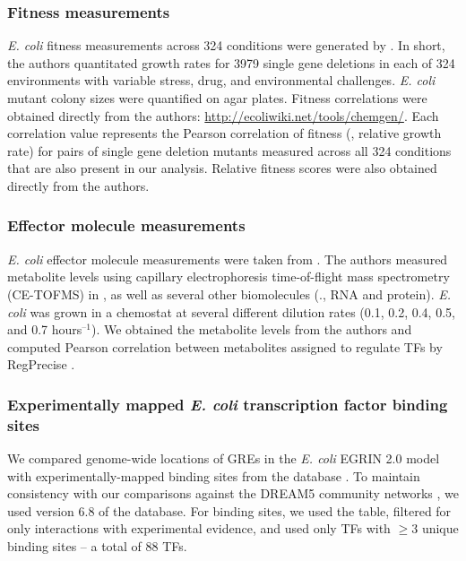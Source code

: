 \subsubsection{Fitness measurements}
\label{section:fitness}
{\it E. coli} fitness measurements across 324 conditions were
generated by \cite{Nichols2011}. In short, the authors quantitated
growth rates for 3979 single gene deletions in each of 324 environments 
with variable stress, drug, and environmental challenges. \textit{E. coli} mutant
colony sizes were quantified on agar plates.  
Fitness correlations were obtained directly from the authors: \href{http://ecoliwiki.net/tools/chemgen/}{http://ecoliwiki.net/tools/chemgen/}. Each correlation value represents
the Pearson correlation of fitness (\ie, relative growth rate) for
pairs of single gene deletion mutants measured across all 324
conditions that are also present in our analysis. Relative fitness scores were also obtained directly from the authors. 

\subsubsection{Effector molecule measurements}

{\it E. coli} effector molecule measurements were taken from \cite{Ishii2007}. The authors measured metabolite levels using capillary electrophoresis time-of-flight mass spectrometry (CE-TOFMS) in \eco, as well as several other biomolecules (\eg., RNA and protein). \textit{E. coli} was grown in a chemostat at several different dilution rates (0.1, 0.2, 0.4, 0.5, and 0.7 hours$^{–1}$). We obtained the metabolite levels from the authors and computed Pearson correlation between metabolites assigned to regulate TFs by RegPrecise \cite{Novichkov2010}.

\subsubsection{Experimentally mapped {\it E. coli} transcription factor binding sites}

We compared genome-wide locations of GREs in the {\it E. coli} EGRIN
2.0 model with experimentally-mapped binding sites from the \rdb
database \cite{Gama-Castro2011}. To maintain consistency with our
comparisons against the DREAM5 community networks \cite{Marbach2012},
we used version 6.8 of the database. For binding sites, we used the
{} table, filtered for only interactions with
experimental evidence, and used only TFs with $\geq 3$ unique binding
sites -- a total of 88 TFs.

